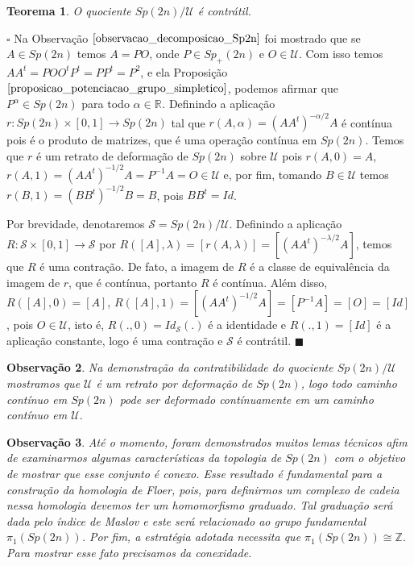 \documentclass[12pt]{book}
\newtheorem{teorema}{Teorema}[section]
\newtheorem{observacao}[teorema]{Observação}
\newenvironment{prova}[1]{$\square$ #1}{\hfill$\blacksquare$}
\newcommand{\grupofundamental}[1]{\pi_{1}(#1)}
\newcommand{\gruposimpletico}[1]{Sp(#1)}
\newcommand{\gruposimpleticopositivo}[1]{Sp_{+}(#1)}
\newcommand{\inteiros}{\mathbb{Z}}
\newcommand{\matrizSimpleticaOrtogonal}{\mathcal{U}}
\newcommand{\real}[1]{\mathbb{R}^{#1}}
\begin{document}
	\begin{teorema}
		O quociente $\gruposimpletico{2n}/\matrizSimpleticaOrtogonal$ é contrátil.
	\end{teorema}
	\begin{prova}
		Na Observação $\ref{observacao_decomposicao_Sp2n}$ foi mostrado que se $A \in \gruposimpletico{2n}$ temos $A=PO$, onde $P \in \gruposimpleticopositivo{2n}$ e $O \in \matrizSimpleticaOrtogonal$. Com isso temos $AA^{t} = POO^{t}P^{t} = PP^{t}=P^{2}$, e ela Proposição $\ref{proposicao_potenciacao_grupo_simpletico}$, podemos afirmar que $P^{\alpha} \in \gruposimpletico{2n}$ para todo $\alpha \in \real{}$. Definindo a aplicação $r:\gruposimpletico{2n}\times [0,1] \to \gruposimpletico{2n}$ tal que $r(A, \alpha) = (AA^{t})^{-\alpha/2}A$ é contínua pois é o produto de matrizes, que é uma operação contínua em $\gruposimpletico{2n}$. Temos que $r$ é um retrato de deformação de $\gruposimpletico{2n}$ sobre $\matrizSimpleticaOrtogonal$ pois $r(A, 0) = A$, $r(A, 1) = (AA^{t})^{-1/2}A = P^{-1}A = O \in \matrizSimpleticaOrtogonal$ e, por fim, tomando $B \in \matrizSimpleticaOrtogonal$ temos $r(B, 1) = (BB^{t})^{-1/2}B = B$, pois $BB^{t} = Id$.
		
		Por brevidade, denotaremos $\mathcal{S} = \gruposimpletico{2n}/\matrizSimpleticaOrtogonal$. Definindo a aplicação $R:\mathcal{S} \times [0,1] \to \mathcal{S}$ por $R([A], \lambda) = [r(A, \lambda)] = [(AA^{t})^{-\lambda/2}A]$, temos que $R$ é uma contração. De fato, a imagem de $R$ é a classe de equivalência da imagem de $r$, que é contínua, portanto $R$ é contínua. Além disso, $R([A], 0) = [A]$, $R([A], 1) = [(AA^{t})^{-1/2}A] = [P^{-1}A] = [O] = [Id]$, pois $O \in \matrizSimpleticaOrtogonal$, isto é, $R(., 0) = Id_{\mathcal{S}}(.)$ é a identidade e $R(., 1) = [Id]$ é a aplicação constante, logo é uma contração e $\mathcal{S}$ é contrátil.
	\end{prova}
	
	\begin{observacao}\label{observacao_quociente_grupo_simpletico_contratil}
		Na demonstração da contratibilidade do quociente $\gruposimpletico{2n}/\matrizSimpleticaOrtogonal$ mostramos que $\matrizSimpleticaOrtogonal$ é um retrato por deformação de $\gruposimpletico{2n}$, logo todo caminho contínuo em $\gruposimpletico{2n}$ pode ser deformado contínuamente em um caminho contínuo em $\matrizSimpleticaOrtogonal$.
	\end{observacao}
	
	\begin{observacao}\label{observacao_conexidade_grupo_simpletico}
		Até o momento, foram demonstrados muitos lemas técnicos afim de examinarmos algumas características da topologia de $\gruposimpletico{2n}$ com o objetivo de mostrar que esse conjunto é conexo. Esse resultado é fundamental para a construção da homologia de Floer, pois, para definirmos um complexo de cadeia nessa homologia devemos ter um homomorfismo graduado. Tal graduação será dada pelo índice de Maslov e este será relacionado ao grupo fundamental $\grupofundamental{\gruposimpletico{2n}}$. Por fim, a estratégia adotada necessita que $\grupofundamental{\gruposimpletico{2n}} \cong \inteiros$. Para mostrar esse fato precisamos da conexidade.
	\end{observacao}
\end{document}
